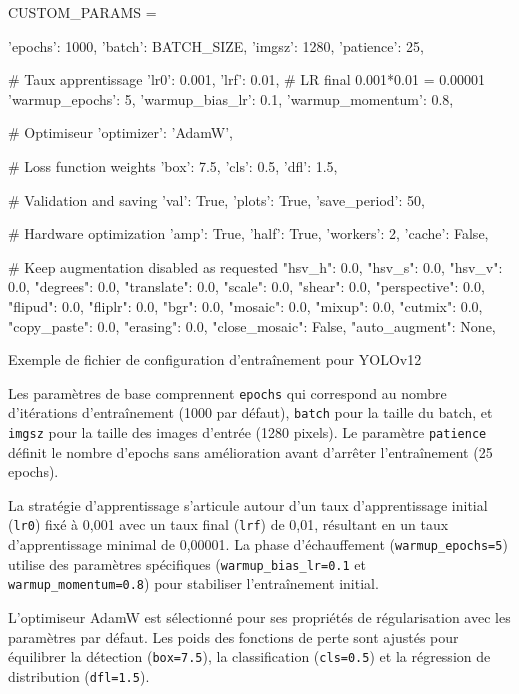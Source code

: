 \begin{code}[H]
    \begin{pythoncode}
    CUSTOM_PARAMS = {
        'epochs': 1000,
        'batch': BATCH_SIZE,
        'imgsz': 1280,
        'patience': 25,
    
        # Taux apprentissage
        'lr0': 0.001,
        'lrf': 0.01, # LR final 0.001*0.01 = 0.00001
        'warmup_epochs': 5,
        'warmup_bias_lr': 0.1,
        'warmup_momentum': 0.8,
    
        # Optimiseur
        'optimizer': 'AdamW',
    
        # Loss function weights
        'box': 7.5,
        'cls': 0.5,
        'dfl': 1.5,

        # Validation and saving
        'val': True,
        'plots': True,
        'save_period': 50,
        
        # Hardware optimization
        'amp': True,
        'half': True,
        'workers': 2,
        'cache': False,

        # Keep augmentation disabled as requested
        "hsv_h": 0.0, "hsv_s": 0.0, "hsv_v": 0.0,
        "degrees": 0.0, "translate": 0.0, "scale": 0.0,
        "shear": 0.0, "perspective": 0.0, "flipud": 0.0,
        "fliplr": 0.0, "bgr": 0.0, "mosaic": 0.0,
        "mixup": 0.0, "cutmix": 0.0, "copy_paste": 0.0,
        "erasing": 0.0, "close_mosaic": False,
        "auto_augment": None,
    }
    \end{pythoncode}
    \caption{Exemple de fichier de configuration d'entraînement pour YOLOv12}
    \label{code:ch36_entrainement_config_yolo}
\end{code}

Les paramètres de base comprennent \texttt{epochs} qui correspond au nombre d'itérations d'entraînement (1000 par défaut), \texttt{batch} pour la taille du batch, et \texttt{imgsz} pour la taille des images d'entrée (1280 pixels). Le paramètre \texttt{patience} définit le nombre d'epochs sans amélioration avant d'arrêter l'entraînement (25 epochs).

La stratégie d'apprentissage s'articule autour d'un taux d'apprentissage initial (\texttt{lr0}) fixé à 0,001 avec un taux final (\texttt{lrf}) de 0,01, résultant en un taux d'apprentissage minimal de 0,00001. La phase d'échauffement (\texttt{warmup\_epochs=5}) utilise des paramètres spécifiques (\texttt{warmup\_bias\_lr=0.1} et \texttt{warmup\_momentum=0.8}) pour stabiliser l'entraînement initial.

L'optimiseur AdamW est sélectionné pour ses propriétés de régularisation avec les paramètres par défaut. Les poids des fonctions de perte sont ajustés pour équilibrer la détection (\texttt{box=7.5}), la classification (\texttt{cls=0.5}) et la régression de distribution (\texttt{dfl=1.5}).

